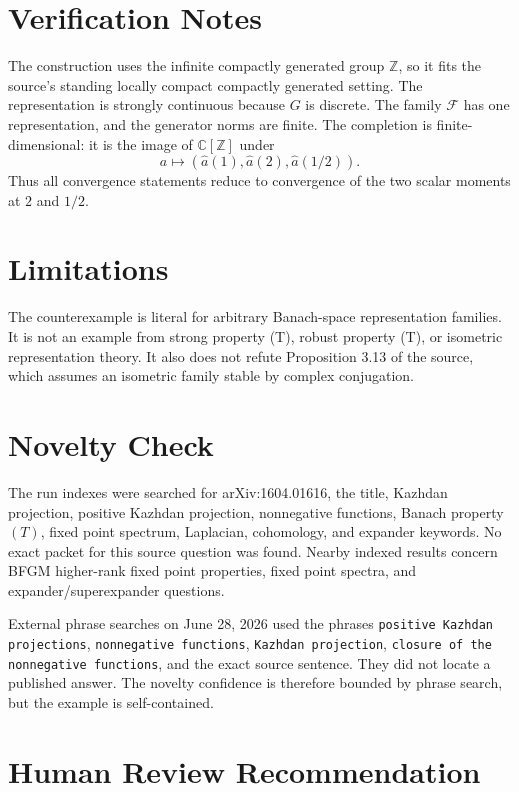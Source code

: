 \documentclass[11pt]{article}
\newcommand{\C}{\mathbb C}
\newcommand{\Z}{\mathbb Z}
\newcommand{\cF}{\mathcal F}
\begin{document}
\section*{Verification Notes}

The construction uses the infinite compactly generated group \(\Z\), so it
fits the source's standing locally compact compactly generated setting. The
representation is strongly continuous because \(G\) is discrete. The family
\(\cF\) has one representation, and the generator norms are finite. The
completion is finite-dimensional: it is the image of \(\C[\Z]\) under
\[
  a\mapsto(\widehat a(1),\widehat a(2),\widehat a(1/2)).
\]
Thus all convergence statements reduce to convergence of the two scalar
moments at \(2\) and \(1/2\).

\section*{Limitations}

The counterexample is literal for arbitrary Banach-space representation
families. It is not an example from strong property (T), robust property (T),
or isometric representation theory. It also does not refute Proposition 3.13
of the source, which assumes an isometric family stable by complex
conjugation.

\section*{Novelty Check}

The run indexes were searched for arXiv:1604.01616, the title, Kazhdan
projection, positive Kazhdan projection, nonnegative functions, Banach property
\((T)\), fixed point spectrum, Laplacian, cohomology, and expander keywords.
No exact packet for this source question was found. Nearby indexed results
concern BFGM higher-rank fixed point properties, fixed point spectra, and
expander/superexpander questions.

External phrase searches on June 28, 2026 used the phrases
\texttt{positive Kazhdan projections}, \texttt{nonnegative functions},
\texttt{Kazhdan projection}, \texttt{closure of the nonnegative functions},
and the exact source sentence. They did not locate a published answer. The
novelty confidence is therefore bounded by phrase search, but the example is
self-contained.

\section*{Human Review Recommendation}
\end{document}
